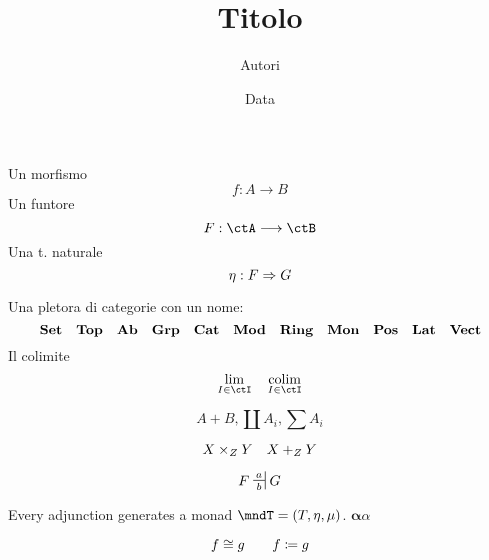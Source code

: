 \documentclass[ paper=a4
              , pagesize
              , fontsize=12pt
              , twoside=true
              , BCOR=5mm
              , DIV=calc
              , bibliography=totoc
              , final
              , version=last
              ]{scrbook}
\begin{document}
\frontmatter

\title{Titolo}
\author{Autori}
\date{Data}
\publishers{Casa editrice}
\uppertitleback{Dettagli pubblicazione I}
\lowertitleback{Dettagli pubblicazione II}
\dedication{Dedica}

\maketitle

\tableofcontents

\mainmatter

\Blinddocument



Un morfismo
\[f : A \to B\]
Un funtore
\[F : \ctA \fun \ctB\]
Una t. naturale
\[\eta : F \nat G\]

Una pletora di categorie con un nome:
\[
\ctSet\quad
\ctTop\quad
\ctAb\quad
\ctGrp\quad
\ctCat\quad
\ctMod\quad
\ctRing\quad
\ctMon\quad
\ctPos\quad
\ctLat\quad
\ctVect\]
Il colimite
\[\lim_{I\in\ctI} \quad \colim_{I\in\ctI}\]


\[A + B, \coprod A_i, \sum A_i\]

\[\pull{X}{Y}{Z} \quad \push{X}{Y}{Z}\]

\[F\adjunct[a][b] G\]

Every adjunction generates a monad $\mndT = (T, \eta,\mu)$. $\boldsymbol{\alpha}\alpha$

\[f \iso g\qquad f \defeq g\]

\clearpage
\appendix


\backmatter
\end{document}
